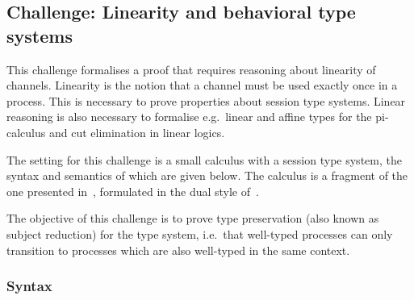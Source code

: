 \subsection{Challenge: Linearity and behavioral type systems}
\label{sec:challenge:linearity-beh-types}
\renewcommand{\Cempty}{\cdot}
\renewcommand{\Csplit}[2]{#1,  #2}
\renewcommand{\Cupdate}[2]{#1, #2}
\newcommand{\TinV}[2]{{?#1}.#2}
\newcommand{\ToutV}[2]{{!#1}.#2}
\newcommand{\tend}[1]{\mathbf{end}(#1)}
This challenge formalises a proof that requires reasoning about linearity of channels.
Linearity is the notion that a channel must be used exactly once in a process.
This is necessary to prove properties about session type systems.
Linear reasoning is also necessary to formalise e.g.\ linear and affine types for the pi-calculus and cut elimination in linear logics.

The setting for this challenge is a small calculus with a session type
system, the syntax and semantics of which are given below. The
calculus is a fragment of the one presented in~\cite{Vasconcelos2012},
formulated in the dual style of~\cite{barber96tr}.

The objective of this challenge is to prove type preservation (also
known as subject reduction) for the type system, i.e.\ that well-typed
processes can only transition to processes which are also well-typed
in the same context.

\subsubsection{Syntax}


